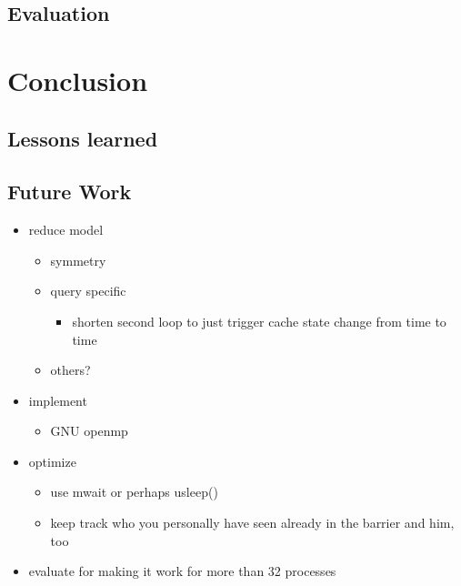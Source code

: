 \documentclass[a4paper, 10pt]{article}
\begin{document}
\subsection{Evaluation}

\section{Conclusion}
\subsection{Lessons learned}
\subsection{Future Work}
\begin{itemize}
	\item reduce model
		\begin{itemize}
		\item symmetry
		\item query specific
			\begin{itemize}
				\item shorten second loop to just trigger cache state change from time to time
			\end{itemize}
		\item others?
		\end{itemize}
	\item implement
		\begin{itemize}
			\item GNU openmp
		\end{itemize}
	\item optimize
		\begin{itemize}
			\item use mwait or perhaps usleep()
			\item keep track who you personally have seen already in the barrier and him, too
		\end{itemize}
	\item evaluate for making it work for more than 32 processes
\end{itemize}


\nocite{*} %

{}
\end{document}
